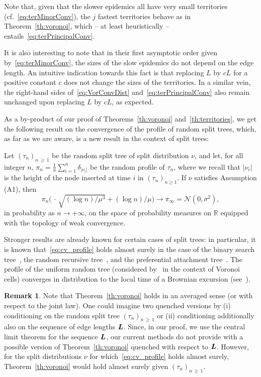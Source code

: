\documentclass[10pt]{amsart}
\theoremstyle{definition}\newtheorem{defi}[theo]{Definition}\newtheorem{rema}[theo]{Remark}\newtheorem{exam}[theo]{Example}\newtheorem{exem}[theo]{Example}\newtheorem{nota}[theo]{Notation}
\newcommand{\bs}{\ensuremath{\boldsymbol}}
\newcommand{\bbR}{\mathbb{R}}
\newcommand{\clN}{\mathcal{N}}
\begin{document}
Note that, given that the slower epidemics all have very small territories (cf.~\eqref{eq:terMinorConv}), the $j$ fastest territories behave as in Theorem~\ref{th:voronoi}, which -- at least heuristically -- entails~\eqref{eq:terPrincipalConv}.

It is also interesting to note that in their first asymptotic order given by~\eqref{eq:terMinorConv}, the sizes of the slow epidemics do not depend on the edge length. An intuitive indication towards this fact is that replacing $L$ by $cL$ for a positive constant $c$ does not change the sizes of the territories. In a similar vein, the right-hand sides of~\eqref{eq:VorConvDist} and~\eqref{eq:terPrincipalConv} also remain unchanged upon replacing $L$ by $cL$, as expected.

As a by-product of our proof of Theorems~\ref{th:voronoi} and~\ref{th:territories}, we get the following result on the convergence of the profile of random split trees, which, as far as we are aware, is a new result in the context of split trees:

\begin{prop}\label{prop:profile}
Let $(\tau_n)_{n\,\geq\,1}$ be the random split tree of split distribution $\nu$, and let, for all integer $n$, $\pi_n = \frac1n\sum_{i=1}^n \delta_{|\nu_i|}$ be the random profile of $\tau_n$, where we recall that $|\nu_i|$ is the height of the node inserted at time $i$ in $(\tau_n)_{n\geq 1}$. If $\nu$ satisfies Assumption {\rm (A1)}, then
\begin{equation}\label{eq:cv_profile}
\pi_n\big(\,\cdot\,\sqrt{(\log n)/\mu^3}+ (\log n)/\mu\big) \to \pi_{\infty}=\clN(0,\sigma^2),
\end{equation}
in probability as $n\to+\infty$, on the space of probability measures on $\bbR$ equipped with the topology of weak convergence.
\end{prop}

Stronger results are already known for certain cases of split trees: in particular, it is known that~\eqref{eq:cv_profile} holds almost surely in the case of the binary search tree~\cite{CDJ01}, the random recursive tree~\cite{MM17}, and the preferential attachment tree~\cite{Katona05}. The profile of the uniform random tree (considered by~\cite{Chapuy} in the context of Voronoi cells) converges in distribution to the local time of a Brownian excursion (see~\cite{DG}).


\begin{rema}\label{rk:quenched_vs_annealed}
Note that Theorem~\ref{th:voronoi} holds in an averaged sense (or with respect to the joint law). One could imagine two quenched versions by (i) conditioning on the random split tree $(\tau_n)_{n\,\geq\,1}$ or (ii) conditioning additionally also on the sequence of edge lengths $\bs L$. Since, in our proof, we use the central limit theorem for the sequence $\bs L$, our current methods do not provide with a possible version of Theorem~\ref{th:voronoi} quenched with respect to $\bs L$. However, for the split distributions $\nu$ for which~\eqref{eq:cv_profile} holds almost surely, Theorem~\ref{th:voronoi} would hold almost surely given $(\tau_n)_{n\,\geq\,1}$.
\end{rema}
\end{document}
